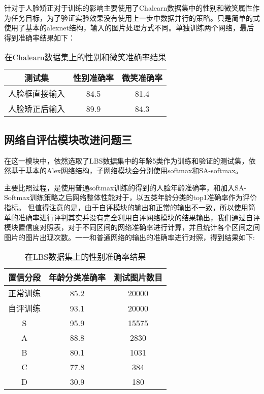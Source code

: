 针对于人脸矫正对于训练的影响主要使用了Chalearn数据集中的性别和微笑属性作为任务目标，为了验证实验效果没有使用上一步中数据并行的策略。只是简单的式使用了基本的alexnet结构，输入的图片处理方式不同。单独训练两个网络，最后得到准确率结果如下：
\begin{table}[!h]
  \centering
   \caption{在Chalearn数据集上的性别和微笑准确率结果}
   \begin{tabular}{c|c|c}
     \toprule
     测试集&性别准确率&微笑准确率\\
     \midrule
     人脸框直接输入  & 84.5 & 81.4 \\
	 人脸矫正后输入  & 89.9 & 84.3 \\
     \bottomrule
   \end{tabular}
\end{table}
\subsection{网络自评估模块改进问题三}
在这一模块中，依然选取了LBS数据集中的年龄5类作为训练和验证的测试集，依然基于基本的Alex网络结构，子网络模块会分别使用softmax和SA-softmax。

主要比照过程，是使用普通softmax训练的得到的人脸年龄准确率，和加入SA-Softmax训练策略之后网络整体性能对于，以五类年龄分类的top1准确率作为评价指标。
但值得注意的是，由于自评模块的输出和正常的输出不一致，所以使用简单的准确率进行评判其实并没有完全利用自评网络模块的结果输出，我们通过自评模块置信度对照表，对于不同区间的网络准确率进行计算，并且统计各个区间之间图片的图片出现次数。一一和普通网络的输出的准确率进行对照，得到结果如下:
\begin{table}[!h]
  \centering
   \caption{在LBS数据集上的性别准确率结果}
   \begin{tabular}{c|c|c}
     \toprule
     置信分段&年龄分类准确率&测试图片数目\\
     \midrule
      正常训练 &  85.2 & 20000 \\
	  自评训练 &  93.1 & 20000 \\	  
      S        &  95.9 & 15575 \\
	  A        &  88.8 & 2830 \\
	  B        &  80.1 & 1031 \\
	  C        &  77.8 & 384  \\
	  D        &  30.9 & 180  \\
     \bottomrule
   \end{tabular}
\end{table}

